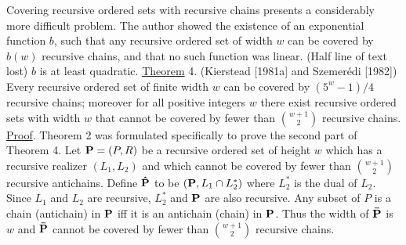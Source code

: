 \documentclass[twoside]{article}
\begin{document}
Covering recursive ordered sets with recursive chains presents a considerably more difficult problem.   The author showed the existence of an exponential function   $b$, such that any recursive ordered set of width   $w$ can be covered by   $b(w)$   recursive chains, and that no such function was linear.
(Half line of text lost) $b$	is at least quadratic.
\newpage
%
%
\noindent\underline{Theorem} 4.    (Kierstead [1981a] and Szemer\'{e}di [1982]) Every recursive ordered set of finite width   $w$   can be covered by $(5^w   - 1)/4$   recursive chains; moreover for all positive integers    $w$    there exist recursive ordered sets with width   $w$     that cannot be covered by fewer than  $\binom{w+1}{2}$ recursive chains.\\
\newline
\underline{Proof}.     Theorem 2 was formulated specifically to prove the second part of 
Theorem 4.    Let    $\mathbf{P} = (P,R)$ be a recursive ordered set of height $w$ which has a
recursive realizer   $(L_1,L_2)$ and which cannot be covered by fewer than $\binom{w+1}{2}$
recursive antichains.    Define   $\mathbf{\hat{P}}$   to be $(\mathbf{P},L_1\cap L_2^*)$ where	$L_2^*$ is the dual of
$L_2$.    Since   $L_1$   and   $L_2$   are recursive,  $L_2^*$     and $\mathbf{P}$   are also recursive. Any subset of   $P$   is a chain (antichain) in   $\mathbf{P}$   iff it is an antichain (chain) in $\mathbf{P}$.    
Thus the width of   $\mathbf{\bar{P}}$   is   $w$   and   $\mathbf{\bar{P}}$   cannot be covered by fewer than $\binom{w+1}{2}$ recursive chains.\\
\end{document}
